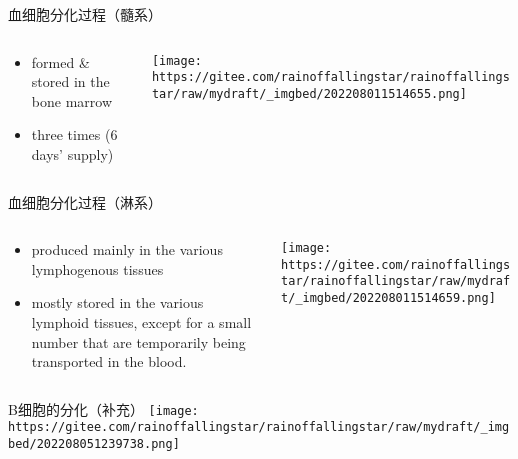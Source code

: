 \documentclass[
  ignorenonframetext,
]{beamer}
\begin{document}
\begin{frame}
\begin{block}{血细胞分化过程（髓系）}
\protect\hypertarget{ux8840ux7ec6ux80deux5206ux5316ux8fc7ux7a0bux9ad3ux7cfb}{}
\begin{columns}[T]
\begin{column}{0.4\textwidth}
\begin{itemize}
\item
  formed \& stored in the bone marrow
\item
  three times (6 days' supply)
\end{itemize}
\end{column}

\begin{column}{0.6\textwidth}
\texttt{[image: https://gitee.com/rainoffallingstar/rainoffallingstar/raw/mydraft/\_imgbed/202208011514655.png]}
\end{column}
\end{columns}
\end{block}
\end{frame}

\begin{frame}
\begin{block}{血细胞分化过程（淋系）}
\protect\hypertarget{ux8840ux7ec6ux80deux5206ux5316ux8fc7ux7a0bux6dcbux7cfb}{}
\begin{columns}[T]
\begin{column}{0.4\textwidth}
\begin{itemize}
\item
  produced mainly in the various lymphogenous tissues
\item
  mostly stored in the various lymphoid tissues, except for a small
  number that are temporarily being transported in the blood.
\end{itemize}
\end{column}

\begin{column}{0.6\textwidth}
\texttt{[image: https://gitee.com/rainoffallingstar/rainoffallingstar/raw/mydraft/\_imgbed/202208011514659.png]}
\end{column}
\end{columns}
\end{block}
\end{frame}

\begin{frame}
\begin{block}{B细胞的分化（补充）}
\protect\hypertarget{bux7ec6ux80deux7684ux5206ux5316ux8865ux5145}{}
\texttt{[image: https://gitee.com/rainoffallingstar/rainoffallingstar/raw/mydraft/\_imgbed/202208051239738.png]}
\end{block}
\end{frame}
\end{document}
